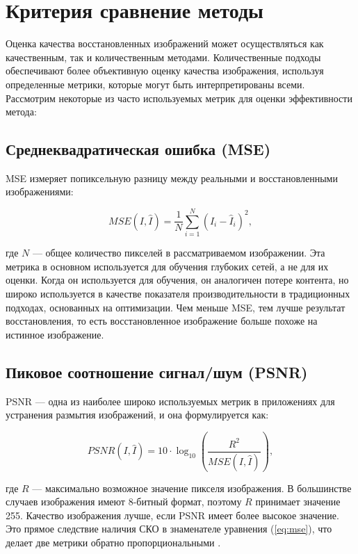 \section{Критерия сравнение методы}

Оценка качества восстановленных изображений может осуществляться как качественным, так и количественным методами. Количественные подходы обеспечивают более объективную оценку качества изображения, используя определенные метрики, которые могут быть интерпретированы всеми. Рассмотрим некоторые из часто используемых метрик для оценки эффективности метода:

\subsection{Среднеквадратическая ошибка (MSE)}

MSE измеряет попиксельную разницу между реальными и восстановленными изображениями:

\begin{equation}\label{eq:mse}
MSE(I, \hat{I}) = \frac{1}{N} \sum_{i=1}^{N} (I_{i} - \hat{I}_{i})^2,
\end{equation}

где \(N\) — общее количество пикселей в рассматриваемом изображении. Эта метрика в основном используется для обучения глубоких сетей, а не для их оценки. Когда он используется для обучения, он аналогичен потере контента, но широко используется в качестве показателя производительности в традиционных подходах, основанных на оптимизации. Чем меньше MSE, тем лучше результат восстановления, то есть восстановленное изображение больше похоже на истинное изображение.

\subsection{Пиковое соотношение сигнал/шум (PSNR)}

PSNR — одна из наиболее широко используемых метрик в приложениях для устранения размытия изображений, и она формулируется как:

\begin{equation}
	PSNR(I, \hat{I}) = 10 \cdot \log_{10} \left( \frac{R^{2}}{MSE(I, \hat{I})} \right),
\end{equation}

где \(R\) — максимально возможное значение пикселя изображения. В большинстве случаев изображения имеют 8-битный формат, поэтому \(R\) принимает значение 255. Качество изображения лучше, если PSNR имеет более высокое значение. Это прямое следствие наличия СКО в знаменателе уравнения (\ref{eq:mse}), что делает две метрики обратно пропорциональными \cite{hore2010image}.

